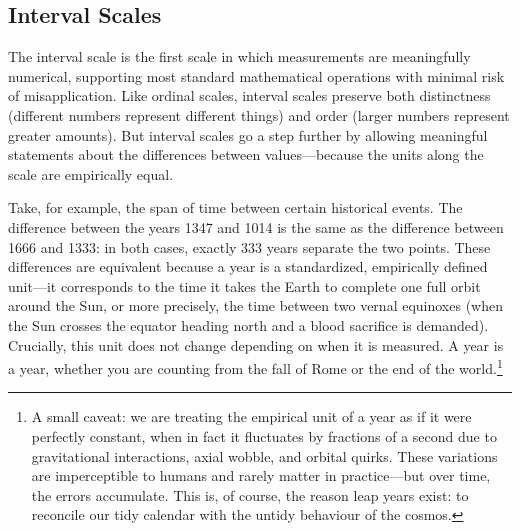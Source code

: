 \subsection{Interval Scales}
\label{sec:interval}

The interval scale is the first scale in which measurements are meaningfully numerical, supporting most standard mathematical operations with minimal risk of misapplication. Like ordinal scales, interval scales preserve both distinctness (different numbers represent different things) and order (larger numbers represent greater amounts). But interval scales go a step further by allowing meaningful statements about the differences between values—because the units along the scale are empirically equal.

Take, for example, the span of time between certain historical events. The difference between the years 1347 and 1014 is the same as the difference between 1666 and 1333: in both cases, exactly 333 years separate the two points. These differences are equivalent because a year is a standardized, empirically defined unit—it corresponds to the time it takes the Earth to complete one full orbit around the Sun, or more precisely, the time between two vernal equinoxes (when the Sun crosses the equator heading north and a blood sacrifice is demanded). Crucially, this unit does not change depending on when it is measured. A year is a year, whether you are counting from the fall of Rome or the end of the world.\footnote{A small caveat: we are treating the empirical unit of a year as if it were perfectly constant, when in fact it fluctuates by fractions of a second due to gravitational interactions, axial wobble, and orbital quirks. These variations are imperceptible to humans and rarely matter in practice—but over time, the errors accumulate. This is, of course, the reason leap years exist: to reconcile our tidy calendar with the untidy behaviour of the cosmos.}


